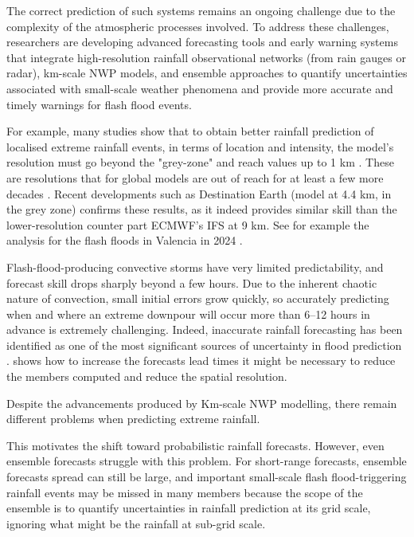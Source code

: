 The correct prediction of such systems remains an ongoing challenge due to the complexity of the atmospheric processes involved. To address these challenges, researchers are developing advanced forecasting tools and early warning systems that integrate high-resolution rainfall observational networks (from rain gauges or radar), km-scale NWP models, and ensemble approaches to quantify uncertainties associated with small-scale weather phenomena and provide more accurate and timely warnings for flash flood events.

For example, many studies show that to obtain better rainfall prediction of localised extreme rainfall events, in terms of location and intensity, the model's resolution must go beyond the "grey-zone" and reach values up to 1 km \citep{Castorina_2022}. These are resolutions that for global models are out of reach for at least a few more decades \citep{Wedi_2020}. Recent developments such as Destination Earth (model at 4.4 km, in the grey zone) confirms these results, as it indeed provides similar skill than the lower-resolution counter part ECMWF's IFS at 9 km. See for example the analysis for the flash floods in Valencia in 2024 \citep{Gascon}.

Flash-flood-producing convective storms have very limited predictability, and forecast skill drops sharply beyond a few hours. Due to the inherent chaotic nature of convection, small initial errors grow quickly, so accurately predicting when and where an extreme downpour will occur more than 6–12 hours in advance is extremely challenging. Indeed, inaccurate rainfall forecasting has been identified as one of the most significant sources of uncertainty in flood prediction \citep{Hapuarachchi_2011}. \citet{Schwartz_2019a, Schwartz_2019b} shows how to increase the forecasts lead times it might be necessary to reduce the members computed and reduce the spatial resolution. 

Despite the advancements produced by Km-scale NWP modelling, there remain different problems when predicting extreme rainfall. 

This motivates the shift toward probabilistic rainfall forecasts. However, even ensemble forecasts struggle with this problem. For short-range forecasts, ensemble forecasts spread can still be large, and important small-scale flash flood-triggering rainfall events may be missed in many members because the scope of the ensemble is to quantify uncertainties in rainfall prediction at its grid scale, ignoring what might be the rainfall at sub-grid scale. 


